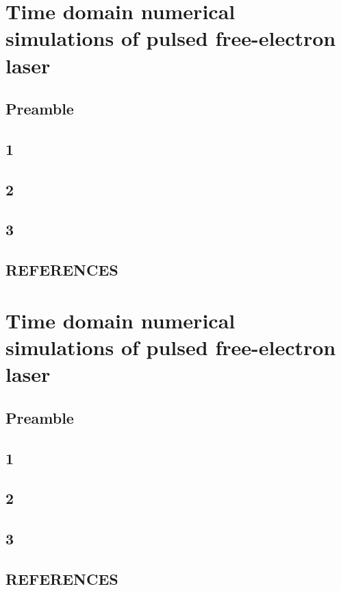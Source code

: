 \documentclass[11pt, letterpaper]{article}
\begin{document}
\tableofcontents
% 
%
\newpage
\section{Time domain numerical simulations of pulsed free-electron laser}
	\subsection{Preamble}
	\subsection{1}
	\subsection{2}
	\subsection{3}
	\subsection{REFERENCES}

% 
%
\newpage
\section{Time domain numerical simulations of pulsed free-electron laser}
	\subsection{Preamble}
	\subsection{1}
	\subsection{2}
	\subsection{3}
	\subsection{REFERENCES}

% 
%
\newpage
\end{document}

